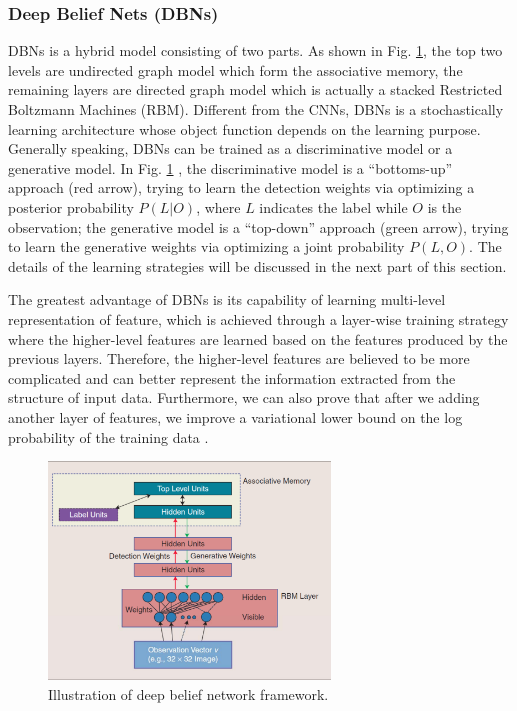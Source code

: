 \documentclass[conference]{IEEEtran}
\begin{document}
\subsubsection{Deep Belief Nets (DBNs)}


DBNs is a hybrid model consisting of two parts. As shown in Fig. \ref{fig:dbn}, the top two levels are undirected graph model which form the associative memory, the remaining layers are directed graph model which is actually a stacked Restricted Boltzmann Machines (RBM). Different from the CNNs, DBNs is a stochastically learning architecture whose object
function depends on the learning purpose. Generally speaking, DBNs can be trained as a discriminative model or a generative model. In Fig. \ref{fig:dbn} , the discriminative model is a ``bottoms-up'' approach (red arrow), trying to
learn the detection weights via optimizing a posterior probability $P(L|O)$, where $L$ indicates the label while $O$ is the observation; the generative model is a ``top-down'' approach (green arrow), trying to learn the generative weights via optimizing a joint probability $P(L,O)$. The details of the learning strategies will be discussed in the next part of this section.

The greatest advantage of DBNs is its capability of learning multi-level representation of feature, which is achieved through a layer-wise training strategy where the higher-level features are learned based on the features produced by the previous layers. Therefore, the higher-level features are believed to be more complicated and can better represent the information extracted from the structure of input data. Furthermore, we can also prove that after we adding another layer of features, we improve a variational lower bound on the log probability of the training data \cite{Hinton}.

\begin{figure}[t]
\centering
\includegraphics[width=75mm]{dbn.pdf}
\caption{Illustration of deep belief network framework\cite{new_frontier}.}
\label{fig:dbn}
\end{figure}
\end{document}
